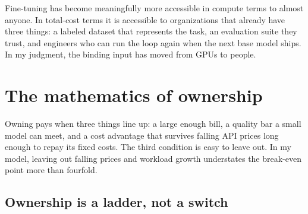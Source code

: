 Fine-tuning has become meaningfully more accessible in compute terms to almost anyone. In total-cost terms it is accessible to organizations that already have three things: a labeled dataset that represents the task, an evaluation suite they trust, and engineers who can run the loop again when the next base model ships. In my judgment, the binding input has moved from GPUs to people.

\section{The mathematics of ownership}\label{sec:math}

Owning pays when three things line up: a large enough bill, a quality bar a small model can meet, and a cost advantage that survives falling API prices long enough to repay its fixed costs. The third condition is easy to leave out. In my model, leaving out falling prices and workload growth understates the break-even point more than fourfold.

\subsection{Ownership is a ladder, not a switch}

